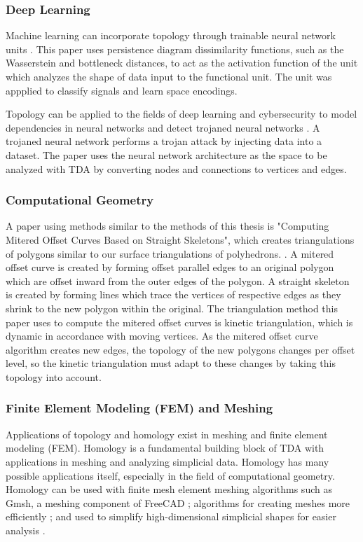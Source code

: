 \documentclass[ma]{uncgdissertationexp}
\theoremstyle{plain}
\theoremstyle{definition}
\theoremstyle{remark}
\begin{document}
\subsubsection{Deep Learning}
\par Machine learning can incorporate topology through trainable neural network units \cite{oballe2021tofu}. This paper uses persistence diagram dissimilarity functions, such as the Wasserstein and bottleneck distances, to act as the activation function of the unit which analyzes the shape of data input to the functional unit. The unit was appplied to classify signals and learn space encodings.
\par Topology can be applied to the fields of deep learning and cybersecurity to model dependencies in neural networks and detect trojaned neural networks \cite{zheng2021topological}. A trojaned neural network performs a trojan attack by injecting data into a dataset. The paper uses the neural network architecture as the space to be analyzed with TDA by converting nodes and connections to vertices and edges.
\subsubsection{Computational Geometry}
\par A paper using methods similar to the methods of this thesis is "Computing Mitered Offset Curves Based on Straight Skeletons", which creates triangulations of polygons similar to our surface triangulations of polyhedrons. \cite{palfrader2015computing}. A mitered offset curve is created by forming offset parallel edges to an original polygon which are offset inward from the outer edges of the polygon. A straight skeleton is created by forming lines which trace the vertices of respective edges as they shrink to the new polygon within the original. The triangulation method this paper uses to compute the mitered offset curves is kinetic triangulation, which is dynamic in accordance with moving vertices. As the mitered offset curve algorithm creates new edges, the topology of the new polygons changes per offset level, so the kinetic triangulation must adapt to these changes by taking this topology into account.
\subsubsection{Finite Element Modeling (FEM) and Meshing}
\par Applications of topology and homology exist in meshing and finite element modeling (FEM). Homology is a fundamental building block of TDA with applications in meshing and analyzing simplicial data. Homology has many possible applications itself, especially in the field of computational geometry. Homology can be used with finite mesh element meshing algorithms such as Gmsh, a meshing component of FreeCAD \cite{homology_fem_computation}; algorithms for creating meshes more efficiently \cite{3d_vol_iso_mesh}; and used to simplify high-dimensional simplicial shapes for easier analysis \cite{efficient_homology_preserving} \cite{mesh_enhanced_persistent}.
\end{document}
